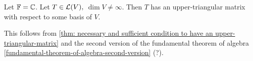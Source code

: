 \setcounter{thm}{46}
\begin{thm}
  \label{thm: sufficienct condition about the field for every operator on V to have an upper-triangular matrix}
  Let $\mathbb{F} = \mathbb{C}$. Let $T\in \mathcal{L} (V),$ $\dim V \neq \infty$. Then $T$ has an upper-triangular matrix with respect to some basis of $V$.
\end{thm}
\begin{prf}
  This follows from \ref{thm: necessary and sufficient condition to have an upper-triangular-matrix} and the second version of the fundamental theorem of algebra \ref{fundamental-theorem-of-algebra-second-version} (?).
\end{prf}